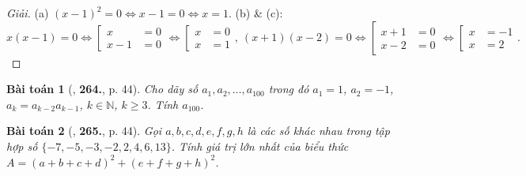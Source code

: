 \documentclass{article}
\numberwithin{equation}{section}
\newtheorem{baitoan}{Bài toán}
\begin{document}
\begin{proof}[Giải]
	(a) $(x - 1)^2 = 0\Leftrightarrow x - 1 = 0\Leftrightarrow x = 1$. (b) \& (c):
	\begin{equation*}
		x(x - 1) = 0\Leftrightarrow\left[\begin{split}
			x &= 0\\
			x - 1 &= 0
		\end{split}\right.\Leftrightarrow\left[\begin{split}
			x &= 0\\
			x &= 1
		\end{split}\right.,\ (x + 1)(x - 2) = 0\Leftrightarrow\left[\begin{split}
			x + 1 &= 0\\
			x - 2 &= 0
		\end{split}\right.\Leftrightarrow\left[\begin{split}
			x &= -1\\
			x &= 2
		\end{split}\right..
	\end{equation*}
\end{proof}

\begin{baitoan}[\cite{Binh_Toan_6_tap_1}, \textbf{264.}, p. 44]
	Cho dãy số $a_1,a_2,\ldots,a_{100}$ trong đó $a_1 = 1$, $a_2 = -1$, $a_k = a_{k-2}a_{k-1}$, $k\in\mathbb{N}$, $k\ge 3$. Tính $a_{100}$.
\end{baitoan}

\begin{baitoan}[\cite{Binh_Toan_6_tap_1}, \textbf{265.}, p. 44]
	Gọi $a,b,c,d,e,f,g,h$ là các số khác nhau trong tập hợp số $\{-7,-5,-3,-2,2,4,6,13\}$. Tính giá trị lớn nhất của biểu thức $A = (a + b + c + d)^2 + (e + f + g + h)^2$.
\end{baitoan}

\end{document}
